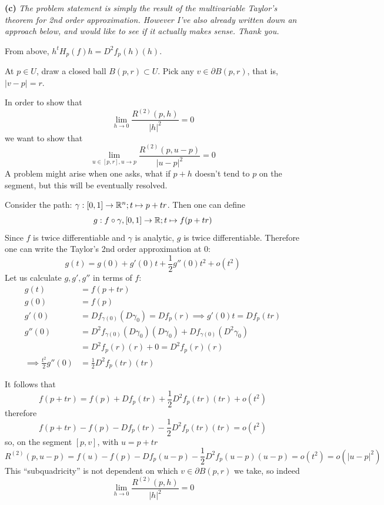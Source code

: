 \documentclass[a4paper, 12pt]{article}
\begin{document}
\begin{solution}
    \textbf{(c)} \textbf{} \emph{The problem statement is simply the result of the multivariable Taylor's theorem for 2nd order approximation. However I've also already written down an approach below, and would like to see if it actually makes sense. Thank you.}

    From above, $h^t H_p(f) h = D^2f_p(h)(h)$.

    At $p \in U$, draw a closed ball $B(p, r) \subset U$. Pick any $v \in \partial B(p, r)$, that is, $|v - p| = r$.

    In order to show that
    \[
        \lim_{h \to 0}\frac{R^{(2)}(p, h)}{|h|^2} = 0
    \]
    we want to show that \[
        \lim_{u \in [p, r], u \to p} \frac{R^{(2)}(p, u-p)}{|u-p|^2} = 0
    \]
    A problem might arise when one asks, what if $p+h$ doesn't tend to $p$ on the segment, but this will be eventually resolved.

    Consider the path: $\gamma: [0, 1] \to \mathbb{R}^n; t \mapsto p + tr$. Then one can define \[
        g: f \circ \gamma, [0,1] \to \mathbb{R}; t \mapsto f(p+tr)
    \]
    Since $f$ is twice differentiable and $\gamma$ is analytic, $g$ is twice differentiable. Therefore one can write the Taylor's 2nd order approximation at 0: \[
        g(t) = g(0) + g'(0)t + \frac{1}{2}g''(0)t^2 + o(t^2)
    \]
    Let us calculate $g, g', g''$ in terms of $f$:
    \begin{align*}
        g(t)                         & = f(p + tr)                                                             \\
        g(0)                         & = f(p)                                                                  \\
        g'(0)                        & = Df_{\gamma(0)}(D\gamma_0) = Df_p(r) \implies g'(0)t = Df_p(tr)        \\
        g''(0)                       & = D^2f_{\gamma(0)}(D\gamma_0)(D\gamma_0) + Df_{\gamma(0)} (D^2\gamma_0) \\
                                     & = D^2f_p(r)(r) + 0 = D^2f_p(r)(r)                                       \\
        \implies \frac{t^2}{2}g''(0) & = \frac{1}{2} D^2f_p(tr)(tr)
    \end{align*}

    It follows that \[
        f(p+tr) = f(p) + Df_p(tr) + \frac{1}{2}D^2f_p(tr)(tr) + o(t^2)
    \]
    therefore \[
        f(p+tr) - f(p) - Df_p(tr) - \frac{1}{2}D^2f_p(tr)(tr) = o(t^2)
    \]
    so, on the segment $[p, v]$, with $u = p + tr$ \[
        R^{(2)}(p, u-p) = f(u) - f(p) - Df_p(u-p) - \frac{1}{2}D^2f_p(u-p)(u-p) = o(t^2) = o(|u-p|^2)
    \]
    This ``subquadricity'' is not dependent on which $v \in \partial B(p, r)$ we take, so indeed \[
        \lim_{h\to 0}\frac{R^{(2)}(p, h)}{|h|^2} = 0
    \]


\end{solution}
\end{document}
